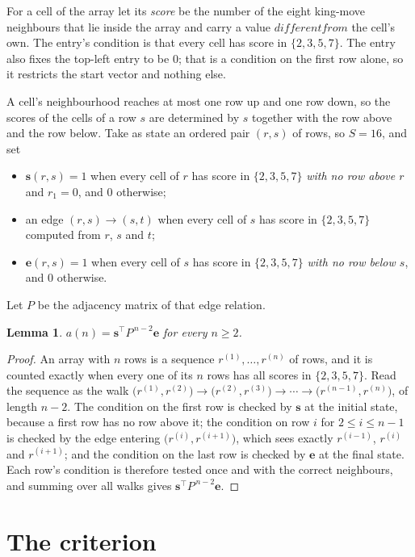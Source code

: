 \documentclass[11pt,a4paper]{article}
\theoremstyle{plain}
\newtheorem{lemma}[theorem]{Lemma}
\theoremstyle{definition}
\begin{document}
For a cell of the array let its \emph{score} be the number of the eight king-move neighbours that lie inside
the array and carry a value $different from$ the cell's own. The entry's condition is that every cell
has score in $\{2,3,5,7\}$. The entry also fixes the top-left entry to be $0$; that is a condition on the first row alone, so it restricts the start vector and nothing else.

A cell's neighbourhood reaches at most one row up and one row down, so the scores of the
cells of a row $s$ are determined by $s$ together with the row above and the row below.
Take as state an ordered pair $(r,s)$ of rows, so $S=16$, and set
\begin{itemize}
\item $\mathbf{s}(r,s)=1$ when every cell of $r$ has score in $\{2,3,5,7\}$ \emph{with no row
above $r$} and $r_1=0$, and $0$ otherwise;
\item an edge $(r,s)\to(s,t)$ when every cell of $s$ has score in $\{2,3,5,7\}$ computed from
$r$, $s$ and $t$;
\item $\mathbf{e}(r,s)=1$ when every cell of $s$ has score in $\{2,3,5,7\}$ \emph{with no row
below $s$}, and $0$ otherwise.
\end{itemize}
Let $P$ be the adjacency matrix of that edge relation.

\begin{lemma}\label{lem:walk}
$a(n)=\mathbf{s}^{\!\top}P^{\,n-2}\mathbf{e}$ for every $n\ge2$.
\end{lemma}

\begin{proof}
An array with $n$ rows is a sequence $r^{(1)},\dots,r^{(n)}$ of rows, and it is counted
exactly when every one of its $n$ rows has all scores in $\{2,3,5,7\}$. Read the sequence as the
walk $\bigl(r^{(1)},r^{(2)}\bigr)\to\bigl(r^{(2)},r^{(3)}\bigr)\to\cdots\to
\bigl(r^{(n-1)},r^{(n)}\bigr)$, of length $n-2$. The condition on the first row is
checked by $\mathbf{s}$ at the initial state, because a first row has no row above it; the
condition on row $i$ for $2\le i\le n-1$ is checked by the edge entering
$\bigl(r^{(i)},r^{(i+1)}\bigr)$, which sees exactly $r^{(i-1)}$, $r^{(i)}$ and
$r^{(i+1)}$; and the condition on the last row is checked by $\mathbf{e}$ at the final
state. Each row's condition is therefore tested once and with the correct neighbours, and
summing over all walks gives $\mathbf{s}^{\!\top}P^{\,n-2}\mathbf{e}$.
\end{proof}

\section{The criterion}
\end{document}
